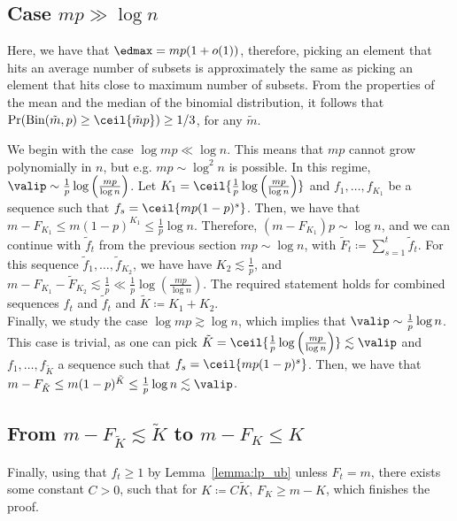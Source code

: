 \subsection*{Case \(mp \gg \log n\)}
Here, we have that \(\edmax = mp (1 + o(1))\), therefore, picking an element that hits an average number of subsets is approximately the same as picking an element that hits close to maximum number of subsets. From the properties of the mean and the median of the binomial distribution, it follows that \(\Pr(\mathrm{Bin}(\tilde m, p) \geq \ceil{\tilde m p}) \geq 1/3\), for any \(\tilde m\). 

We begin with the case \(\log mp \ll \log n\). This means that \(mp\) cannot grow polynomially in \(n\), but e.g. \(mp \sim \log^2 n\) is possible. In this regime, \(\valip \sim \frac{1}{p} \log \left(\frac{mp}{\log n}\right)\). Let \(K_1 = \ceil{\frac{1}{p} \log \left(\frac{mp}{\log n}\right)}\) and \(f_1, \ldots, f_{K_1}\) be a sequence such that \(f_{s} = \ceil{mp(1-p)^s}\). Then, we have that \(m - F_{K_1} \leq m(1 - p)^{K_1} \leq \frac{1}{p}\log n\). Therefore, \((m - F_{K_1})p \sim \log n\), and we can continue with \(\tilde{f}_t\) from the previous section \(mp \sim \log n\), with \(\tilde{F}_t \coloneqq \sum_{s=1}^t \tilde{f}_t\). For this sequence \(\tilde{f}_1, \ldots, \tilde{f}_{K_2}\), we have have \(K_2 \lesssim \frac{1}{p}\), and \(m - F_{K_1} - \tilde{F}_{K_2} \lesssim \frac{1}{p} \ll \frac{1}{p} \log \left(\frac{mp}{\log n}\right)\). The required statement holds for combined sequences \(f_t\) and \(\tilde{f}_t\) and \(\tilde K \coloneqq K_1 + K_2\). \\
\noindent
Finally, we study the case \(\log mp \gtrsim \log n\), which implies that \(\valip \sim \frac{1}{p} \log n\). This case is trivial, as one can pick \(\tilde K = \ceil{\frac{1}{p} \log \left(\frac{mp}{\log n}\right)} \lesssim \valip\) and \(f_1, \ldots, f_{\tilde K}\) a sequence such that \(f_{s} = \ceil{mp(1-p)^s}\). Then, we have that \(m - F_{\tilde K} \leq m(1 - p)^{\tilde K} \leq \frac{1}{p}\log n \lesssim \valip\). 

\subsection*{From \(m - F_{\tilde K} \lesssim \tilde K\) to \(m - F_K \leq K\)}
Finally, using that \(f_t \geq 1\) by Lemma~\ref{lemma:lp_ub} unless \(F_t = m\), there exists some constant \(C > 0\), such that for \(K \coloneqq C\tilde K\), \(F_K \geq m - K\), which finishes the proof.



